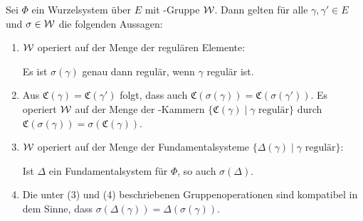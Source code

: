 \begin{prop}
  Sei $\Phi$ ein Wurzelsystem über $E$ mit \weyl\hyp{}Gruppe $\mathcal{W}$.
  Dann gelten für alle $\gamma, \gamma' \in E$ und $\sigma \in \mathcal{W}$ die folgenden Aussagen:
  \begin{enumerate}[(1)]
    \item $\mathcal{W}$ operiert auf der Menge der regulären Elemente: 
      \begin{addmargin}[2em]{2em}
        Es ist $\sigma(\gamma)$ genau dann regulär, wenn $\gamma$ regulär ist.
      \end{addmargin}
      
    \item Aus $\mathfrak{C}(\gamma) = \mathfrak{C}(\gamma')$ folgt, dass auch $\mathfrak{C}(\sigma(\gamma)) = \mathfrak{C}(\sigma(\gamma'))$. 
      Es operiert $\mathcal{W}$ auf der Menge der \weyl\hyp{}Kammern $\{\mathfrak{C}(\gamma) \mid \gamma \text{ regulär}\}$ durch $\mathfrak{C}(\sigma(\gamma)) = \sigma(\mathfrak{C}(\gamma))$.

    \item $\mathcal{W}$ operiert auf der Menge der Fundamentalsysteme $\{\Delta(\gamma) \mid \gamma \text{ regulär}\}$: 
      \begin{addmargin}[2em]{2em}
        Ist $\Delta$ ein Fundamentalsystem für $\Phi$, so auch $\sigma(\Delta)$. 
      \end{addmargin}

    \item Die unter (3) und (4) beschriebenen Gruppenoperationen sind kompatibel in dem Sinne, dass 
      $\sigma(\Delta(\gamma)) = \Delta(\sigma(\gamma))$.
  \end{enumerate}
\end{prop}

